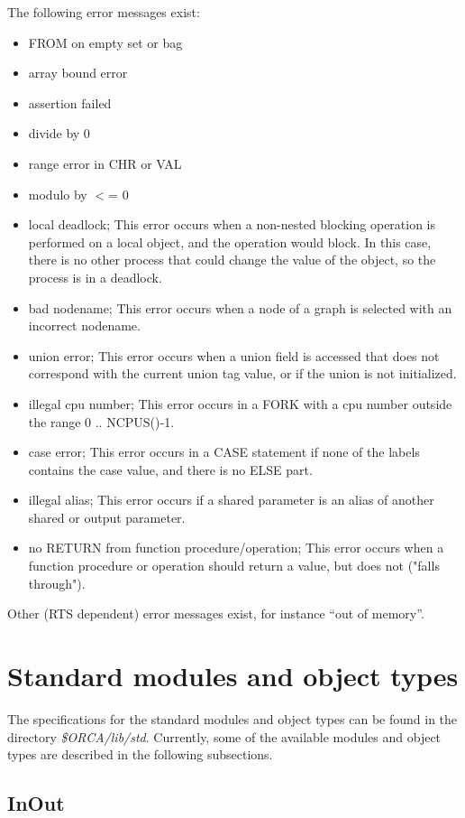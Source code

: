 \documentclass[10pt]{article}
\begin{document}
The following error messages exist:
\begin{itemize}
\item
FROM on empty set or bag
\item
array bound error
\item
assertion failed
\item
divide by 0
\item
range error in CHR or VAL
\item
modulo by $<$= 0
\item
local deadlock;
This error occurs when a non-nested blocking operation is performed on
a local object, and the operation would block.
In this case, there is no other process that could change the value of the
object, so the process is in a deadlock.
\item
bad nodename;
This error occurs when a node of a graph is selected with an incorrect
nodename.
\item
union error;
This error occurs when a union field is accessed that does not correspond
with the current union tag value, or if the union is not initialized.
\item
illegal cpu number;
This error occurs in a FORK with a cpu number outside the range 0 .. NCPUS()-1.
\item
case error;
This error occurs in a CASE statement if none of the labels contains the
case value, and there is no ELSE part.
\item
illegal alias;
This error occurs if a shared parameter is an alias of another shared or
output parameter.
\item
no RETURN from function procedure/operation;
This error occurs when a function procedure or operation should return
a value, but does not ("falls through").
\end{itemize}

Other (RTS dependent) error messages exist, for instance ``out of memory''.

\section{Standard modules and object types}\label{sec:standard}

The specifications for the standard modules and object types can be found
in the directory 
{\em \$ORCA/lib/std}.
Currently, some of the available modules and object types are described
in the following subsections.

\subsection{InOut}
\end{document}
